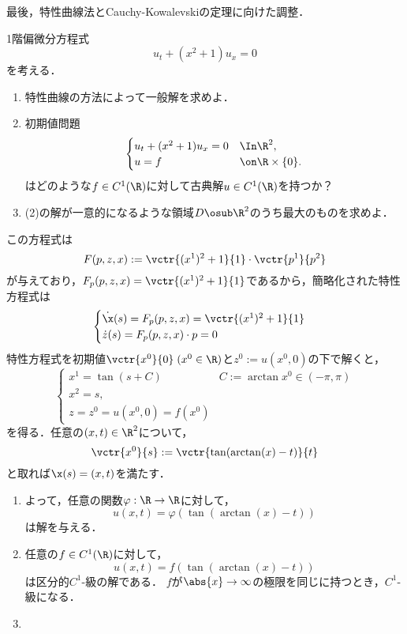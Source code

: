\documentclass[uplatex,dvipdfmx]{jsarticle}
\begin{document}
\begin{tcolorbox}[colframe=ForestGreen, colback=ForestGreen!10!white,breakable,colbacktitle=ForestGreen!40!white,coltitle=black,fonttitle=\bfseries\sffamily,
title=]
    最後，特性曲線法とCauchy-Kowalevskiの定理に向けた調整．
\end{tcolorbox}

\begin{problem}
    1階偏微分方程式
    \[u_t+(x^2+1)u_x=0\]
    を考える．
    \begin{enumerate}
        \item 特性曲線の方法によって一般解を求めよ．
        \item 初期値問題
        \[\begin{cases}
            u_t+(x^2+1)u_x=0&\In\R^2,\\
            u=f&\on\R\times\{0\}.
        \end{cases}\]
        はどのような$f\in C^1(\R)$に対して古典解$u\in C^1(\R)$を持つか？
        \item (2)の解が一意的になるような領域$D\osub\R^2$のうち最大のものを求めよ．
    \end{enumerate}
\end{problem}
\begin{Proof}
    この方程式は
    \[F(p,z,x):=\vctr{(x^1)^2+1}{1}\cdot\vctr{p^1}{p^2}\]
    が与えており，$F_p(p,z,x)=\vctr{(x^1)^2+1}{1}$であるから，簡略化された特性方程式は
    \[\begin{cases}
        \dot{\x}(s)=F_p(p,z,x)=\vctr{(x^1)^2+1}{1}\\
        \dot{z}(s)=F_p(p,z,x)\cdot p=0
    \end{cases}\]
    特性方程式を初期値$\vctr{x^0}{0}\;(x^0\in\R)$と$z^0:=u(x^0,0)$の下で解くと，
    \[\begin{cases}
        x^1=\tan(s+C)&C:=\arctan x^0\in(-\pi,\pi)\\
        x^2=s,\\
        z=z^0=u(x^0,0)=f(x^0)
    \end{cases}\]
    を得る．任意の$(x,t)\in\R^2$について，
    \[\vctr{x^0}{s}:=\vctr{\tan(\arctan(x)-t)}{t}\]
    と取れば$\x(s)=(x,t)$を満たす．
    \begin{enumerate}
        \item よって，任意の関数$\varphi:\R\to\R$に対して，
        \[u(x,t)=\varphi(\tan(\arctan(x)-t))\]
        は解を与える．
        \item 
        任意の$f\in C^1(\R)$に対して，
        \[u(x,t)=f(\tan(\arctan(x)-t))\]
        は区分的$C^1$-級の解である．
        $f$が$\abs{x}\to\infty$の極限を同じに持つとき，$C^1$-級になる．
        \item 
    \end{enumerate}
\end{Proof}
\end{document}

